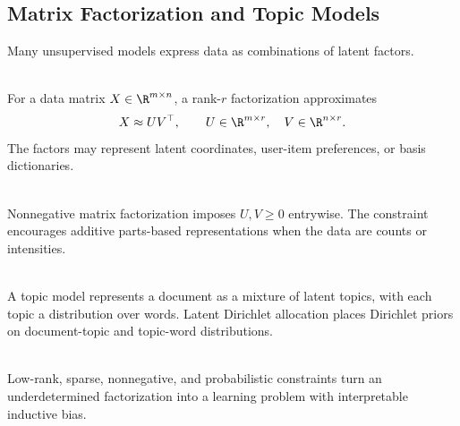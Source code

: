 \subsection{Matrix Factorization and Topic Models}

Many unsupervised models express data as combinations of latent factors.

\begin{definition} \label{def:sl-low-rank-matrix-factorization} \\
For a data matrix $X\in\R^{m\times n}$, a rank-$r$ factorization approximates
\[
X\approx UV^\top,
\qquad
U\in\R^{m\times r},\quad V\in\R^{n\times r}.
\]
The factors may represent latent coordinates, user-item preferences, or basis dictionaries.
\end{definition}

\begin{definition} \label{def:sl-nonnegative-matrix-factorization} \\
Nonnegative matrix factorization imposes $U,V\geq0$ entrywise.  The constraint encourages additive parts-based representations when the data are counts or intensities.
\end{definition}

\begin{definition} \label{def:sl-topic-model} \\
A topic model represents a document as a mixture of latent topics, with each topic a distribution over words.  Latent Dirichlet allocation places Dirichlet priors on document-topic and topic-word distributions.
\end{definition}

\begin{remark} \label{rem:sl-factorization-regularization} \\
Low-rank, sparse, nonnegative, and probabilistic constraints turn an underdetermined factorization into a learning problem with interpretable inductive bias.
\end{remark}
